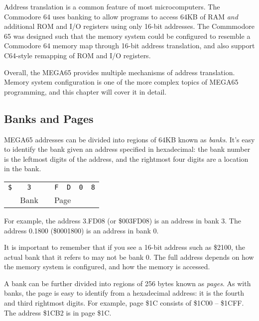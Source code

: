 Address translation is a common feature of most microcomputers. The Commodore
64 uses banking to allow programs to access 64KB of RAM {\em and} additional
ROM and I/O registers using only 16-bit addresses. The Commmodore 65 was
designed such that the memory system could be configured to resemble a
Commodore 64 memory map through 16-bit address translation, and also support
C64-style remapping of ROM and I/O registers.

Overall, the MEGA65 provides multiple mechanisms of address translation. Memory
system configuration is one of the more complex topics of MEGA65 programming,
and this chapter will cover it in detail.

\subsection{Banks and Pages}

MEGA65 addresses can be divided into regions of 64KB known as {\em banks}. It's
easy to identify the bank given an address specified in hexadecimal: the bank
number is the leftmost digits of the address, and the rightmost four digits are
a location in the bank.

\medskip
\begin{center}
\begin{tabular}{m{0.4cm}m{0.4cm}m{0.05cm}m{0.4cm}m{0.4cm}m{0.4cm}m{0.4cm}}
\multicolumn{1}{c}{\huge\texttt{\$}} &
\multicolumn{1}{c}{\huge\texttt{3}} &
\multicolumn{1}{c}{ } &
\multicolumn{1}{c}{\huge\texttt{F}} &
\multicolumn{1}{c}{\huge\texttt{D}} &
\multicolumn{1}{c}{\huge\texttt{0}} &
\multicolumn{1}{c}{\huge\texttt{8}} \\
\cline{2-2}\cline{4-5}
& \multicolumn{1}{c}{\small Bank} & & \multicolumn{2}{c}{\small Page} &
\multicolumn{2}{c}{ } \\
\end{tabular}
\end{center}
\medskip

For example, the address 3.FD08 (or \$003FD08) is an address in bank 3. The
address 0.1800 (\$0001800) is an address in bank 0.

It is important to remember that if you see a 16-bit
address such as \$2100, the actual bank that it refers to may not be bank 0.
The full address depends on how the memory system is configured, and how the
memory is accessed.

A bank can be further divided into regions of 256 bytes known as {\em pages}.
As with banks, the page is easy to identify from a hexadecimal address: it is
the fourth and third rightmost digits. For example, page \$1C consists of
\$1C00 -- \$1CFF. The address \$1CB2 is in page \$1C.

